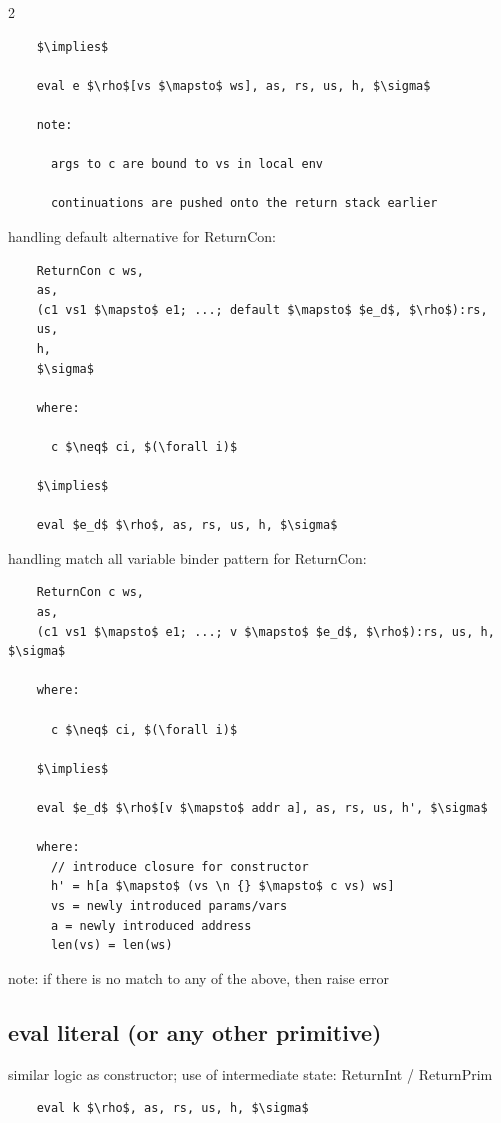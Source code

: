 \documentclass[8pt]{extarticle}
\begin{document}
\begin{multicols*}{2}
\begin{lstlisting}
    $\implies$

    eval e $\rho$[vs $\mapsto$ ws], as, rs, us, h, $\sigma$

    note:

      args to c are bound to vs in local env

      continuations are pushed onto the return stack earlier
  \end{lstlisting}

  handling default alternative for ReturnCon:

  \begin{lstlisting}
    ReturnCon c ws,
    as,
    (c1 vs1 $\mapsto$ e1; ...; default $\mapsto$ $e_d$, $\rho$):rs,
    us,
    h,
    $\sigma$

    where:

      c $\neq$ ci, $(\forall i)$
    
    $\implies$
    
    eval $e_d$ $\rho$, as, rs, us, h, $\sigma$
  \end{lstlisting}

  handling match all variable binder pattern for ReturnCon:

  \begin{lstlisting}
    ReturnCon c ws,
    as,
    (c1 vs1 $\mapsto$ e1; ...; v $\mapsto$ $e_d$, $\rho$):rs, us, h, $\sigma$

    where:

      c $\neq$ ci, $(\forall i)$

    $\implies$

    eval $e_d$ $\rho$[v $\mapsto$ addr a], as, rs, us, h', $\sigma$

    where:
      // introduce closure for constructor
      h' = h[a $\mapsto$ (vs \n {} $\mapsto$ c vs) ws]
      vs = newly introduced params/vars
      a = newly introduced address
      len(vs) = len(ws)
  \end{lstlisting}

  note: if there is no match to any of the above, then raise error
  
  \vfill\null
  \columnbreak

  \subsection{eval literal (or any other primitive)}

  similar logic as constructor; use of intermediate state: ReturnInt / ReturnPrim

  \begin{lstlisting}
    eval k $\rho$, as, rs, us, h, $\sigma$


\end{lstlisting}
\end{multicols*}
\end{document}
